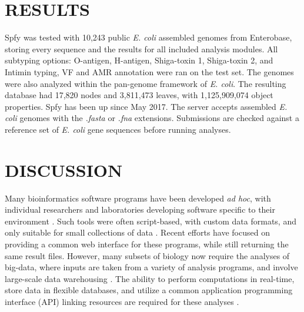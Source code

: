 \documentclass{article}
\begin{document}
\section{RESULTS}
Spfy was tested with 10,243 public \textit{E. coli} assembled genomes from Enterobase, storing every sequence and the results for all included analysis modules.
All subtyping options: O-antigen, H-antigen, Shiga-toxin 1, Shiga-toxin 2, and Intimin typing, VF and AMR annotation were ran on the test set. The genomes were also analyzed within the pan-genome framework of \textit{E. coli}.
The resulting database had 17,820 nodes and 3,811,473 leaves, with 1,125,909,074 object properties.
Spfy has been up since May 2017. The server accepts assembled \textit{E. coli} genomes with the \textit{.fasta} or \textit{.fna} extensions. Submissions are checked against a reference set of \textit{E. coli} gene sequences before running analyses.
\par

\small 




\section{DISCUSSION}

Many bioinformatics software programs have been developed \textit{ad hoc}, with individual researchers and laboratories developing software specific to their environment \cite{de2015trends}.
Such tools were often script-based, with custom data formats, and only suitable for small collections of data \cite{de2015trends}.
Recent efforts \cite{goecks2010galaxy,thomsen2016bacterial} have focused on providing a common web interface for these programs, while still returning the same result files.
However, many subsets of biology now require the analyses of big-data, where inputs are taken from a variety of analysis programs, and involve large-scale data warehousing \cite{schatz2015biological}.
The ability to perform computations in real-time, store data in flexible databases, and utilize a common application programming interface (API) linking resources are required for these analyses \cite{swaminathan2016review}.
\end{document}
